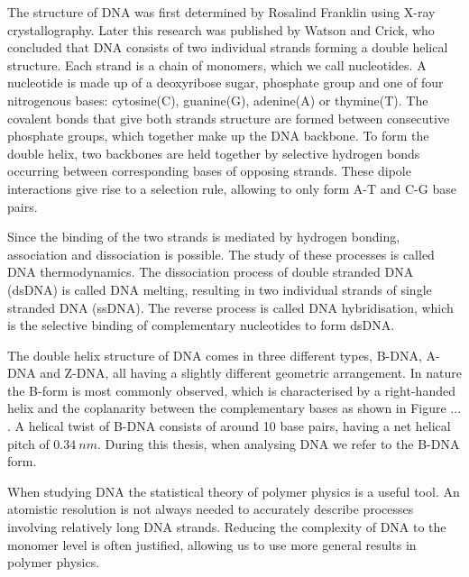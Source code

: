 The structure of DNA was first determined by Rosalind Franklin using X-ray
crystallography. Later this research was published by Watson and Crick, who concluded
that DNA consists of two individual strands forming a double helical
structure.\cite{WATSON1953} Each strand is a chain of monomers, which we call
nucleotides. A nucleotide is made up of a
deoxyribose sugar, phosphate group and one of four nitrogenous bases: cytosine(C),
guanine(G), adenine(A) or thymine(T). The covalent bonds that give both strands structure
are formed between consecutive phosphate groups, which together make up the DNA backbone.
To form the double helix, two backbones are held together by
selective hydrogen bonds occurring between corresponding bases of opposing strands. These
dipole interactions give rise to a selection rule, allowing to only form A-T and C-G base
pairs.

Since the binding of the two strands is mediated by hydrogen bonding, association and
dissociation is possible. The study of these processes is called DNA thermodynamics. The
dissociation process of double stranded DNA (dsDNA) is called DNA melting, resulting in
two individual strands of single stranded DNA (ssDNA). The reverse process is called DNA
hybridisation, which is the selective binding of complementary nucleotides to form dsDNA.

The double helix structure of DNA comes in three different types, B-DNA, A-DNA and Z-DNA,
all having a slightly different geometric arrangement. In nature the B-form is most
commonly observed, which is characterised by a right-handed helix and the coplanarity
between the complementary bases as shown in Figure ... . A helical twist of B-DNA
consists of around 10 base pairs, having a net helical pitch of $0.34\ nm$. During this
thesis, when analysing DNA we refer to the B-DNA form.

When studying DNA the statistical theory of polymer physics is a useful tool. An
atomistic resolution is not always needed to accurately describe processes involving
relatively long DNA strands.  Reducing the complexity of DNA to the monomer level is
often justified, allowing us to use more general results in polymer physics.


